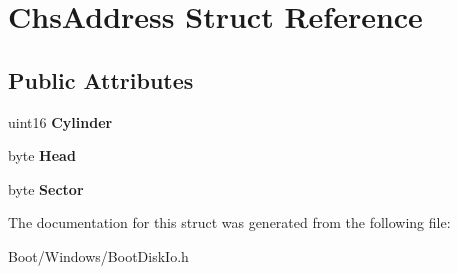 \hypertarget{struct_chs_address}{}\section{Chs\+Address Struct Reference}
\label{struct_chs_address}
\subsection*{Public Attributes}
\begin{DoxyCompactItemize}
\item 
\mbox{\label{struct_chs_address_ad1b8fd68c3e745bf3ee9878027b629cd}} 
uint16 {\bfseries Cylinder}
\item 
\mbox{\label{struct_chs_address_ad93fa8e7abbcd4d5001e5aafc8840085}} 
byte {\bfseries Head}
\item 
\mbox{\label{struct_chs_address_a5a1e420bf8cc3d86d2ae0e7f6bddaf84}} 
byte {\bfseries Sector}
\end{DoxyCompactItemize}


The documentation for this struct was generated from the following file\+:\begin{DoxyCompactItemize}
\item 
Boot/\+Windows/Boot\+Disk\+Io.\+h\end{DoxyCompactItemize}

